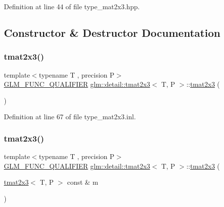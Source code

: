 Definition at line 44 of file type\+\_\+mat2x3.\+hpp.



\subsection{Constructor \& Destructor Documentation}
\mbox{\label{structglm_1_1detail_1_1tmat2x3_a5f05d4dddbc1d6fbaf485c5ea2440117}} 
\subsubsection{\texorpdfstring{tmat2x3()}{tmat2x3()}\hspace{0.1cm}{\footnotesize\ttfamily [1/22]}}
{\footnotesize\ttfamily template$<$typename T , precision P$>$ \\
\hyperlink{setup_8hpp_a33fdea6f91c5f834105f7415e2a64407}{G\+L\+M\+\_\+\+F\+U\+N\+C\+\_\+\+Q\+U\+A\+L\+I\+F\+I\+ER} \hyperlink{structglm_1_1detail_1_1tmat2x3}{glm\+::detail\+::tmat2x3}$<$ T, P $>$\+::\hyperlink{structglm_1_1detail_1_1tmat2x3}{tmat2x3} (\begin{DoxyParamCaption}{ }\end{DoxyParamCaption})}



Definition at line 67 of file type\+\_\+mat2x3.\+inl.

\mbox{\label{structglm_1_1detail_1_1tmat2x3_a4d7107015eb343a44948415ecd5c8402}} 
\subsubsection{\texorpdfstring{tmat2x3()}{tmat2x3()}\hspace{0.1cm}{\footnotesize\ttfamily [2/22]}}
{\footnotesize\ttfamily template$<$typename T , precision P$>$ \\
\hyperlink{setup_8hpp_a33fdea6f91c5f834105f7415e2a64407}{G\+L\+M\+\_\+\+F\+U\+N\+C\+\_\+\+Q\+U\+A\+L\+I\+F\+I\+ER} \hyperlink{structglm_1_1detail_1_1tmat2x3}{glm\+::detail\+::tmat2x3}$<$ T, P $>$\+::\hyperlink{structglm_1_1detail_1_1tmat2x3}{tmat2x3} (\begin{DoxyParamCaption}\item[{\hyperlink{structglm_1_1detail_1_1tmat2x3}{tmat2x3}$<$ T, P $>$ const \&}]{m }\end{DoxyParamCaption})}



